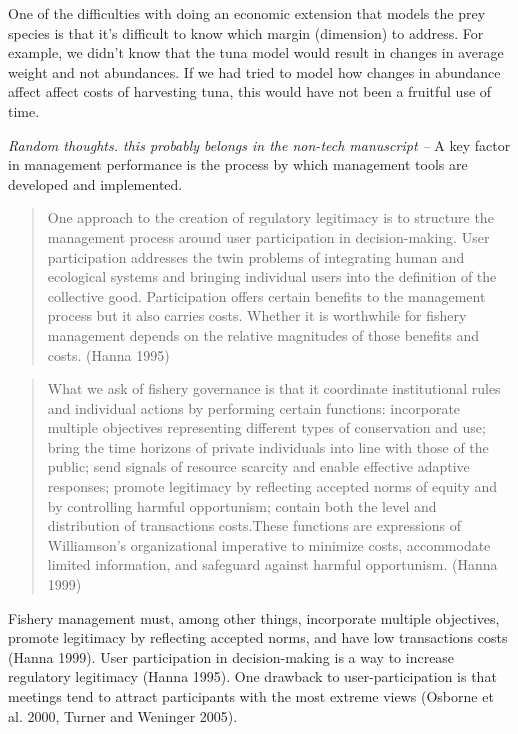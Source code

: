 \documentclass[]{article}
\begin{document}
One of the difficulties with doing an economic extension that models the
prey species is that it's difficult to know which margin (dimension) to
address. For example, we didn't know that the tuna model would result in
changes in average weight and not abundances. If we had tried to model
how changes in abundance affect affect costs of harvesting tuna, this
would have not been a fruitful use of time.

\emph{Random thoughts. this probably belongs in the non-tech manuscript
--} A key factor in management performance is the process by which
management tools are developed and implemented.

\begin{quote}
One approach to the creation of regulatory legitimacy is to structure
the management process around user participation in decision-making.
User participation addresses the twin problems of integrating human and
ecological systems and bringing individual users into the definition of
the collective good. Participation offers certain benefits to the
management process but it also carries costs. Whether it is worthwhile
for fishery management depends on the relative magnitudes of those
benefits and costs. (Hanna 1995)
\end{quote}

\begin{quote}
What we ask of fishery governance is that it coordinate institutional
rules and individual actions by performing certain functions:
incorporate multiple objectives representing different types of
conservation and use; bring the time horizons of private individuals
into line with those of the public; send signals of resource scarcity
and enable effective adaptive responses; promote legitimacy by
reflecting accepted norms of equity and by controlling harmful
opportunism; contain both the level and distribution of transactions
costs.These functions are expressions of Williamson's organizational
imperative to minimize costs, accommodate limited information, and
safeguard against harmful opportunism. (Hanna 1999)
\end{quote}

Fishery management must, among other things, incorporate multiple
objectives, promote legitimacy by reflecting accepted norms, and have
low transactions costs (Hanna 1999). User participation in
decision-making is a way to increase regulatory legitimacy (Hanna 1995).
One drawback to user-participation is that meetings tend to attract
participants with the most extreme views (Osborne et al. 2000, Turner
and Weninger 2005).
\end{document}
